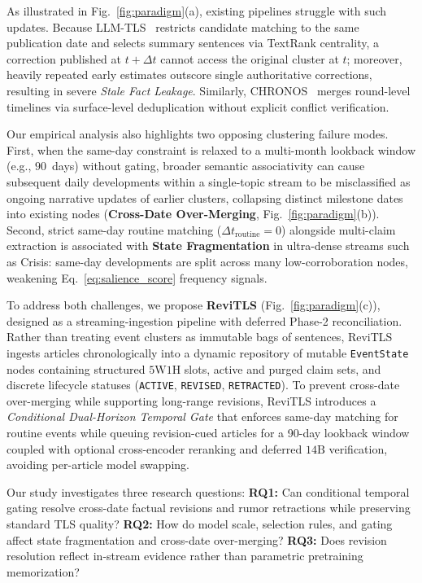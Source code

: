 \documentclass[journal]{IEEEtran}
\begin{document}
As illustrated in Fig.~\ref{fig:paradigm}(a), existing pipelines struggle with such updates. Because LLM-TLS~\cite{hu2024moments} restricts candidate matching to the same publication date and selects summary sentences via TextRank centrality, a correction published at $t + \Delta t$ cannot access the original cluster at $t$; moreover, heavily repeated early estimates outscore single authoritative corrections, resulting in severe \textit{Stale Fact Leakage}. Similarly, CHRONOS~\cite{wu2025unfolding} merges round-level timelines via surface-level deduplication without explicit conflict verification.

Our empirical analysis also highlights two opposing clustering failure modes. First, when the same-day constraint is relaxed to a multi-month lookback window (e.g., $90$~days) without gating, broader semantic associativity can cause subsequent daily developments within a single-topic stream to be misclassified as ongoing narrative updates of earlier clusters, collapsing distinct milestone dates into existing nodes (\textbf{Cross-Date Over-Merging}, Fig.~\ref{fig:paradigm}(b)). Second, strict same-day routine matching ($\Delta t_{\text{routine}}=0$) alongside multi-claim extraction is associated with \textbf{State Fragmentation} in ultra-dense streams such as Crisis: same-day developments are split across many low-corroboration nodes, weakening Eq.~\eqref{eq:salience_score} frequency signals.

To address both challenges, we propose \textbf{ReviTLS} (Fig.~\ref{fig:paradigm}(c)), designed as a streaming-ingestion pipeline with deferred Phase-2 reconciliation. Rather than treating event clusters as immutable bags of sentences, ReviTLS ingests articles chronologically into a dynamic repository of mutable \texttt{EventState} nodes containing structured $5\text{W}1\text{H}$ slots, active and purged claim sets, and discrete lifecycle statuses (\texttt{ACTIVE}, \texttt{REVISED}, \texttt{RETRACTED}). To prevent cross-date over-merging while supporting long-range revisions, ReviTLS introduces a \textit{Conditional Dual-Horizon Temporal Gate} that enforces same-day matching for routine events while queuing revision-cued articles for a 90-day lookback window coupled with optional cross-encoder reranking and deferred $14\text{B}$ verification, avoiding per-article model swapping.

Our study investigates three research questions: \textbf{RQ1:} Can conditional temporal gating resolve cross-date factual revisions and rumor retractions while preserving standard TLS quality? \textbf{RQ2:} How do model scale, selection rules, and gating affect state fragmentation and cross-date over-merging? \textbf{RQ3:} Does revision resolution reflect in-stream evidence rather than parametric pretraining memorization?
\end{document}
